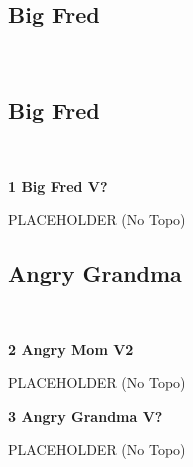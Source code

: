 \begin{multicols*}{2}
		\section{Big Fred}\label{sa:Big Fred}
	\
			\subsection*{Big Fred}\label{bf:Big Fred}
			\
			
					\label{rt:Big Fred} \colorbox{black!20}{\textbf{1 Big Fred V?  }}
					\begin{adjustwidth}{1cm}{}
					PLACEHOLDER
						\newline (No Topo) 
					\end{adjustwidth}
			\subsection*{Angry Grandma}\label{bf:Angry Grandma}
			\
			
					\label{rt:Angry Mom} \colorbox{green!20}{\textbf{2 Angry Mom V2  }}
					\begin{adjustwidth}{1cm}{}
					PLACEHOLDER
						\newline (No Topo) 
					\end{adjustwidth}
					\label{rt:Angry Grandma} \colorbox{black!20}{\textbf{3 Angry Grandma V?  }}
					\begin{adjustwidth}{1cm}{}
					PLACEHOLDER
						\newline (No Topo) 
					\end{adjustwidth}
\end{multicols*}
\clearpage